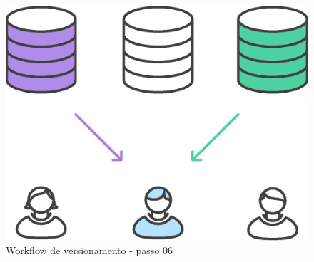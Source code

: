     \begin{figure}[htb]%
        \begin{center}
            \includegraphics[scale=0.2]{./imagens/forkflow6.eps}%
        \end{center}%
        \caption{Workflow de versionamento - passo 06 \label{fig:forkflow06}}%
    \end{figure}%

